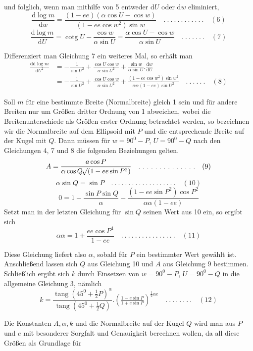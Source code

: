 %
und folglich, wenn man mithilfe von 5 entweder \(\mathrm{d}U\) oder \(\mathrm{d}w\) eliminiert,
\[
\frac{\mathrm{d}\log m}{\mathrm{d}w}=\frac{(1-ee)(\alpha\cos U-\cos w)}{(1-ee\cos w^2)\sin w} \quad .\ .\ .\ .\ .\ .\ .\ .\ .\ .\ .\ .\quad(6)
\]
\[
\frac{\mathrm{d}\log m}{\mathrm{d}U}=\operatorname{cotg}U-\frac{\cos w}{\alpha\sin U}=\frac{\alpha\cos U-\cos w}{\alpha\sin U} \quad .\ .\ .\ .\ .\ .\ .\quad(7)
\]

Differenziert man Gleichung 7 ein weiteres Mal, so erhält man
\[
\begin{aligned}
\frac{\mathrm{dd}\log m}{\mathrm{d}U^2}&=-\frac{1}{\sin U^2}+\frac{\cos U\cos w}{\alpha\sin U^2}+\frac{\sin w}{\alpha\sin U}\mathord{.}\frac{\mathrm{d}w}{\mathrm{d}U}\\
&=-\frac{1}{\sin U^2}+\frac{\cos U\cos w}{\alpha\sin U^2}+\frac{(1-ee\cos w^2)\sin w^2}{\alpha\alpha(1-ee)\sin U^2} \quad .\ .\ .\ .\ .\ .\quad(8)
\end{aligned}
\]

Soll \(m\) für eine bestimmte Breite (Normalbreite) gleich 1 sein und für andere Breiten nur um Größen dritter Ordnung von 1 abweichen, wobei die Breitenunterschiede als Größen erster Ordnung betrachtet werden, so bezeichnen wir die Normalbreite auf dem Ellipsoid mit \(P\) und die entsprechende Breite auf der Kugel mit \(Q\). Dann müssen für \(w=90^0-P\), \(U=90^0-Q\) nach den Gleichungen 4, 7 und 8 die folgenden Beziehungen gelten.
\[
A=\frac{a\cos P}{\alpha\cos Q\mathord{{}^{}\!\surd}(1-ee\sin P^2)} \quad .\ .\ .\ .\ .\ .\ .\ .\ .\ .\ .\ .\ .\ .\quad(9)
\]
\[
\alpha\sin Q=\sin P \quad .\ .\ .\ .\ .\ .\ .\ .\ .\ .\ .\ .\ .\ .\ .\ .\ .\ .\ .\quad(10)
\]
\[
0=1-\frac{\sin P\sin Q}{\alpha}-\frac{(1-ee\sin P^2)\cos P^2}{\alpha\alpha(1-ee)}
\]
Setzt man in der letzten Gleichung für \(\sin Q\) seinen Wert aus 10 ein, so ergibt sich
\[
\alpha\alpha=1+\frac{ee\cos P^4}{1-ee} \quad .\ .\ .\ .\ .\ .\ .\ .\ .\ .\ .\ .\ .\ .\ .\ .\quad(11)
\]

Diese Gleichung liefert also \(\alpha\), sobald für \(P\) ein bestimmter Wert gewählt ist. Anschließend lassen sich \(Q\) aus Gleichung 10 und \(A\) aus Gleichung 9 bestimmen. Schließlich ergibt sich \(k\) durch Einsetzen von \(w=90^0-P\), \(U=90^0-Q\) in die allgemeine Gleichung 3, nämlich
\[
k=\frac{\operatorname{tang}(45^0+\frac{1}{2}P)^\alpha}{\operatorname{tang}(45^0+\frac{1}{2}Q)}\mathord{.}(\tfrac{1-e\sin P}{1+e\sin P})^{\frac{1}{2}\alpha e} \quad .\ .\ .\ .\ .\ .\ .\ .\quad(12)
\]

\indent Die Konstanten \(A,\alpha,k\) und die Normalbreite auf der Kugel \(Q\) wird man aus \(P\) und \(e\) mit besonderer Sorgfalt und Genauigkeit berechnen wollen, da all diese Größen als Grundlage für
